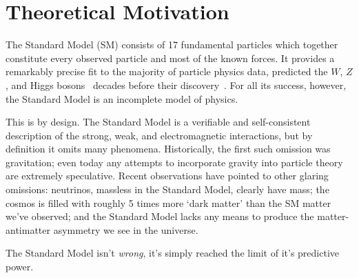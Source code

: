 \chapter{Theoretical Motivation}

The Standard Model (SM) consists of 17 fundamental particles which together constitute every observed particle and most of the known forces.
It provides a remarkably precise fit to the majority of particle physics data, predicted the $W$, $Z$, and Higgs bosons~\cite{wzmass1,higgs1,higgs2} decades before their discovery~\cite{ua1w,ua2w,ua1z,ua2z,atlashiggs,cmshiggs}.
For all its success, however, the Standard Model is an incomplete model of physics.

This is by design. The Standard Model is a verifiable and self-consistent description of the strong, weak, and electromagnetic interactions, but by definition it omits many phenomena.
Historically, the first such omission was gravitation; even today any attempts to incorporate gravity into particle theory are extremely speculative.
Recent observations have pointed to other glaring omissions:
neutrinos, massless in the Standard Model, clearly have mass;
the cosmos is filled with roughly 5 times more `dark matter' than the SM matter we've observed;
and the Standard Model lacks any means to produce the matter-antimatter asymmetry we see in the universe.

The Standard Model isn't \emph{wrong}, it's simply reached the limit of it's predictive power.





